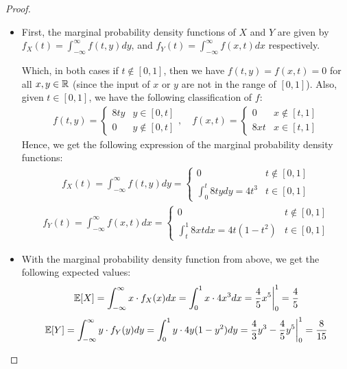 \documentclass{article}
\begin{document}
\begin{proof}

    \hfil

    \begin{itemize}
        \item[(a)] First, the marginal probability density functions of $X$ and $Y$ are given by $f_X(t) = \int_{-\infty}^{\infty}f(t,y)dy$, and $f_Y(t)=\int_{-\infty}^{\infty}f(x,t)dx$ respectively. 
        
        Which, in both cases if $t\notin [0,1]$, then we have $f(t,y)=f(x,t)=0$ for all $x,y\in\mathbb{R}$ (since the input of $x$ or $y$ are not in the range of $[0,1]$). Also, given $t\in[0,1]$, we have the following classification of $f$:
        \begin{align}
            f(t,y)=\begin{cases}
                8ty & y\in[0,t]\\
                0 & y\notin [0,t]
            \end{cases},\quad f(x,t)=\begin{cases}
                0 & x\notin [t,1]\\
                8xt & x\in[t,1]
            \end{cases}
        \end{align}
        Hence, we get the following expression of the marginal probability density functions:
        \begin{align}
            f_X(t) = \int_{-\infty}^{\infty}f(t,y)dy = \begin{cases}
                0 & t\notin [0,1]\\
                \int_{0}^{t}8ty dy = 4t^3 & t\in[0,1]
            \end{cases}
        \end{align}
        \begin{align}
            f_Y(t) = \int_{-\infty}^{\infty}f(x,t)dx = \begin{cases}
                0 & t\notin[0,1]\\
                \int_t^1 8xt dx = 4t(1-t^2) & t\in[0,1]
            \end{cases}
        \end{align}

        \hfil

        \item[(b)] With the marginal probability density function from above, we get the following expected values:
        \begin{align}
            \mathbb{E}[X] = \int_{-\infty}^{\infty}x\cdot f_X(x)dx = \int_{0}^{1}x \cdot 4x^3dx = \frac{4}{5}x^5\bigg|_{0}^{1}=\frac{4}{5}
        \end{align}
        \begin{align}
            \mathbb{E}[Y]=\int_{-\infty}^{\infty}y\cdot f_Y(y)dy = \int_{0}^{1}y\cdot 4y(1-y^2)dy = \frac{4}{3}y^3 - \frac{4}{5}y^5\bigg|_{0}^{1} = \frac{8}{15}
        \end{align}
    \end{itemize}
\end{proof}
\end{document}
